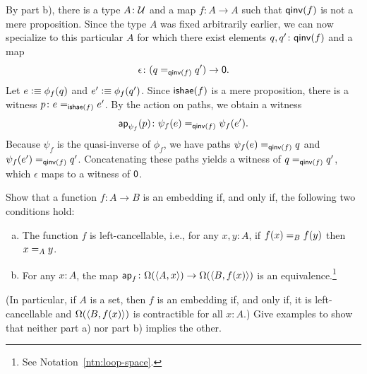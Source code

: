 \begin{solution}
\begin{enumerate}[a)]
        By part b), there is a type\/ $A\colon\univ$ and a map\/ $f\colon A\to A$ such that\/ $\mathsf{qinv}(f)$ is not a mere proposition. Since the type\/ $A$ was fixed arbitrarily earlier, we can now specialize to this particular\/ $A$ for which there exist elements\/ $q,q'\colon\fun{qinv}(f)$ and a map
        \[
            \epsilon\colon(q\eq{\fun{qinv}(f)}q')\to\fun0.
        \]
        Let $e\mathrel{\vcentcolon}\equiv\phi_f(q)$ and $e'\mathrel{\vcentcolon}\equiv\phi_f(q')$. Since $\mathsf{ishae}(f)$ is a mere proposition, there is a witness $p\colon e\eq{\fun{ishae}(f)}e'$. By the action on paths, we obtain a witness
        \[
            \fun{ap}_{\psi_f}(p)\colon
                \psi_f(e)
                \eq{\fun{qinv}(f)}
                \psi_f(e').
        \]
        Because $\psi_f$ is the quasi-inverse of $\phi_f$, we have paths $\psi_f(e)\mathrel{=_{\mathsf{qinv}(f)}}q$ and $\psi_f(e')\mathrel{=_{\mathsf{qinv}(f)}}q'$. Concatenating these paths yields a witness of $q\mathrel{=_{\mathsf{qinv}(f)}}q'$, which $\epsilon$ maps to a witness of $\mathsf{0}$.
    \end{enumerate}
\end{solution}

\begin{exr}\label{exr:embedding-equivalence}
    Show that a function\/ $f\colon A\to B$ is an embedding if, and only if, the following two conditions hold:
    \begin{enumerate}[a),font=\upshape]
        \item The function\/ $f$ is left-cancellable, i.e., for any\/ $x,y\colon A$, if\/ $f(x)\mathrel{=_{B}}f(y)$ then\/ $x\mathrel{=_{A}}y$.
        \item For any\/ $x\colon A$, the map\/ $\fun{ap}_f\colon\Omega(\dep{A,x})\to\Omega(\dep{B,f(x)})$ is an equivalence.\footnote{See Notation~\ref{ntn:loop-space}.}
    \end{enumerate}
    (In particular, if\/ $A$ is a set, then\/ $f$ is an embedding if, and only if, it is left-cancellable and\/ $\Omega(\langle B,f(x)\rangle)$ is contractible for all\/ $x\colon A$.) Give examples to show that neither part\/ {\upshape a)} nor part\/ {\upshape b)} implies the other.
\end{exr}

